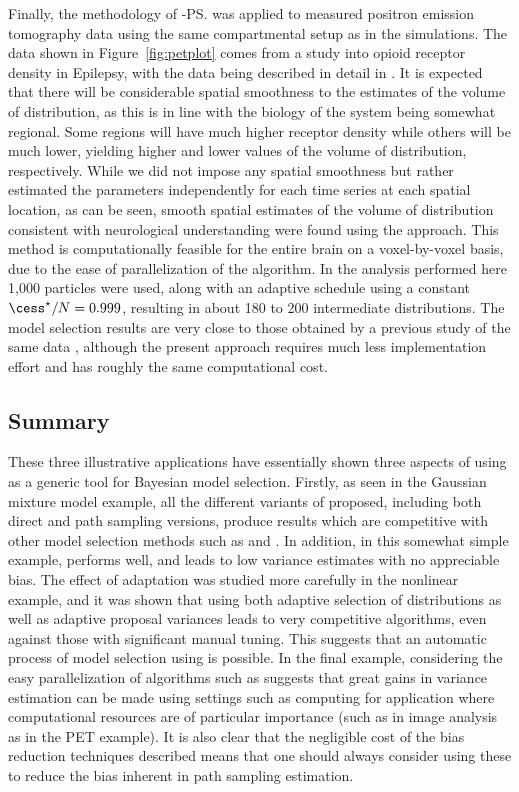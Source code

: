 Finally, the methodology of \smc[2]-\ps was applied to measured positron
emission tomography data using the same compartmental setup as in the
simulations. The data shown in Figure~\ref{fig:petplot} comes from a study
into opioid receptor density in Epilepsy, with the data being described in
detail in \cite{Jiang:2009kf}. It is expected that there will be considerable
spatial smoothness to the estimates of the volume of distribution, as this is
in line with the biology of the system being somewhat regional. Some regions
will have much higher receptor density while others will be much lower,
yielding higher and lower values of the volume of distribution, respectively.
While we did not impose any spatial smoothness but rather estimated the
parameters independently for each time series at each spatial location, as can
be seen, smooth spatial estimates of the volume of distribution consistent
with neurological understanding were found using the approach. This method is
computationally feasible for the entire brain on a voxel-by-voxel basis, due
to the ease of parallelization of the \smc algorithm. In the analysis
performed here 1,000 particles were used, along with an adaptive schedule
using a constant $\cess^\star/N = 0.999$, resulting in about 180 to 200
intermediate distributions. The model selection results are very close to
those obtained by a  previous study of the same data \cite{Zhou2013}, although
the present approach requires much less implementation effort and has roughly
the same computational cost.

\subsection{Summary}

These three illustrative applications have essentially shown three aspects of
using \smc as a generic tool for Bayesian model selection. Firstly, as seen in
the Gaussian mixture model example, all the different variants of \smc
proposed, including both direct and path sampling versions, produce results
which are competitive with other model selection methods such as \rjmcmc and
\pmcmc. In addition, in this somewhat simple example, \smc[2] performs well,
and leads to low variance estimates with no appreciable bias. The effect of
adaptation was studied more carefully in the nonlinear \ode example, and it
was shown that using both adaptive selection of distributions as well as
adaptive proposal variances leads to very competitive algorithms, even against
those with significant manual tuning. This suggests that an automatic process
of model selection using \smc[2] is possible. In the final example,
considering the easy parallelization of algorithms such as \smc[2] suggests
that great gains in variance estimation can be made using settings such as
\gpu computing for application where computational resources are of particular
importance (such as in image analysis as in the PET example). It is also clear
that the negligible cost of the bias reduction techniques described means that
one should always consider using these to reduce the bias inherent in path
sampling estimation.

